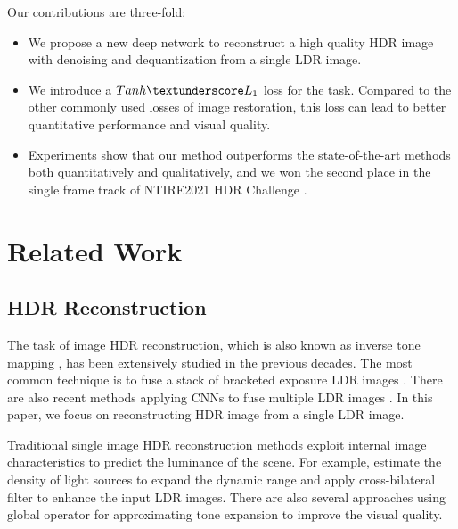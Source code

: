 \documentclass[final]{cvpr}
\begin{document}
Our contributions are three-fold: 
\begin{itemize}
\setlength{\itemsep}{0pt}
\setlength{\parsep}{0pt}
\setlength{\parskip}{0pt}
\item We propose a new deep network to reconstruct a high quality HDR image with denoising and dequantization from a single LDR image.
\item We introduce a $Tanh \textunderscore L_1$ loss for the task. Compared to the other commonly used losses of image restoration, this loss can lead to better quantitative performance and visual quality.
\item Experiments show that our method outperforms the state-of-the-art methods both quantitatively and qualitatively, and we won the second place in the single frame track of NTIRE2021 HDR Challenge \cite{perez2021ntire}.

\end{itemize}

\section{Related Work}
\subsection{HDR Reconstruction}
The task of image HDR reconstruction, which is also known as inverse tone mapping \cite{banterle2006inverse}, has been extensively studied in the previous decades. The most common technique is to fuse a stack of bracketed exposure LDR images \cite{debevec2008recovering}. There are also recent methods applying CNNs to fuse multiple LDR images \cite{wu2018deep, kalantari2017deep, endo2017deep}. In this paper, we focus on reconstructing HDR image from a single LDR image. 

Traditional single image HDR reconstruction methods exploit internal image characteristics to predict the luminance of the scene. For example, \cite{akyuz2007hdr, banterle2009high, banterle2006inverse, banterle2007framework} estimate the density of light sources to expand the dynamic range and \cite{huo2014physiological, kovaleski2014high} apply cross-bilateral filter to enhance the input LDR images. There are also several approaches \cite{masia2009evaluation, masia2017} using global operator for approximating tone expansion to improve the visual quality. 
\end{document}
